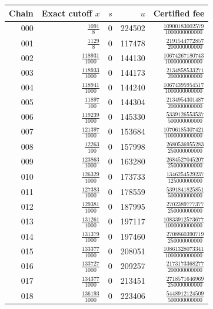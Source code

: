 \begin{longtable}{@{}rrrrr@{}}
\toprule Chain & Exact cutoff $x$ & $s$ & $u$ & Certified fee\\\midrule\endhead
000 & $\frac{1091}{8}$ & 0 & 224502 & $\frac{10900183002579}{1000000000000}$\\[3pt]
001 & $\frac{1129}{8}$ & 0 & 117478 & $\frac{2191544772857}{200000000000}$\\[3pt]
002 & $\frac{118931}{1000}$ & 0 & 144130 & $\frac{10674267180743}{1000000000000}$\\[3pt]
003 & $\frac{118933}{1000}$ & 0 & 144173 & $\frac{2134858533271}{200000000000}$\\[3pt]
004 & $\frac{118941}{1000}$ & 0 & 144240 & $\frac{10674395954517}{1000000000000}$\\[3pt]
005 & $\frac{11897}{100}$ & 0 & 144304 & $\frac{2134954301487}{200000000000}$\\[3pt]
006 & $\frac{119239}{1000}$ & 0 & 145330 & $\frac{5339126553537}{500000000000}$\\[3pt]
007 & $\frac{121397}{1000}$ & 0 & 153684 & $\frac{10706185307421}{1000000000000}$\\[3pt]
008 & $\frac{12263}{100}$ & 0 & 157998 & $\frac{2680536955283}{250000000000}$\\[3pt]
009 & $\frac{123863}{1000}$ & 0 & 163280 & $\frac{2684527045207}{250000000000}$\\[3pt]
010 & $\frac{126329}{1000}$ & 0 & 173733 & $\frac{1346254529237}{125000000000}$\\[3pt]
011 & $\frac{127383}{1000}$ & 0 & 178559 & $\frac{5391841825851}{500000000000}$\\[3pt]
012 & $\frac{129381}{1000}$ & 0 & 187995 & $\frac{2702389777377}{250000000000}$\\[3pt]
013 & $\frac{131261}{1000}$ & 0 & 197117 & $\frac{10833912573677}{1000000000000}$\\[3pt]
014 & $\frac{131379}{1000}$ & 0 & 197460 & $\frac{2708860390719}{250000000000}$\\[3pt]
015 & $\frac{133377}{1000}$ & 0 & 208051 & $\frac{10861328073341}{1000000000000}$\\[3pt]
016 & $\frac{133727}{1000}$ & 0 & 209257 & $\frac{2173173368277}{200000000000}$\\[3pt]
017 & $\frac{134377}{1000}$ & 0 & 213451 & $\frac{2718571646969}{250000000000}$\\[3pt]
018 & $\frac{136193}{1000}$ & 0 & 223406 & $\frac{5448912124509}{500000000000}$\\[3pt]

\end{longtable}
